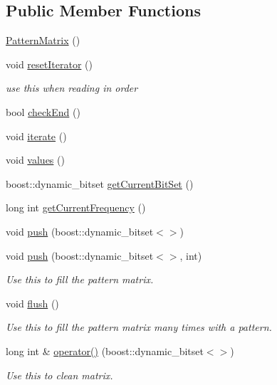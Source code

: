 \subsection*{Public Member Functions}
\begin{DoxyCompactItemize}
\item 
\hyperlink{classPatternMatrix_aaaf6e5d86e4d5fd0bbc907f5c445f1d7}{Pattern\+Matrix} ()
\item 
void \hyperlink{classPatternMatrix_a636096859a24b38dd40623e581bcb460}{reset\+Iterator} ()
\begin{DoxyCompactList}\small\item\em use this when reading in order \end{DoxyCompactList}\item 
bool \hyperlink{classPatternMatrix_ae005cb9835142294ed5cbad3c9ab6a0f}{check\+End} ()
\item 
void \hyperlink{classPatternMatrix_a6b6ba61b62f8bfdba73531d47c64564b}{iterate} ()
\item 
void \hyperlink{classPatternMatrix_a45439edd37b28bf95db6834109a6b73b}{values} ()
\item 
boost\+::dynamic\+\_\+bitset \hyperlink{classPatternMatrix_a0b425a01da86b03bb6391048249865a6}{get\+Current\+Bit\+Set} ()
\item 
long int \hyperlink{classPatternMatrix_ac5daa989c86d2120ea02fcf9453aadce}{get\+Current\+Frequency} ()
\item 
void \hyperlink{classPatternMatrix_a5d119f21c186839184ada1bd9ac45014}{push} (boost\+::dynamic\+\_\+bitset$<$$>$)
\item 
void \hyperlink{classPatternMatrix_a726e8b1896020d5ae830e5b95ce2bb5e}{push} (boost\+::dynamic\+\_\+bitset$<$$>$, int)
\begin{DoxyCompactList}\small\item\em Use this to fill the pattern matrix. \end{DoxyCompactList}\item 
void \hyperlink{classPatternMatrix_a6277b0638d14a5f6e102f4579ad1db67}{flush} ()
\begin{DoxyCompactList}\small\item\em Use this to fill the pattern matrix many times with a pattern. \end{DoxyCompactList}\item 
long int \& \hyperlink{classPatternMatrix_a31abaeb56d1657aa8e239de985a1116f}{operator()} (boost\+::dynamic\+\_\+bitset$<$$>$)
\begin{DoxyCompactList}\small\item\em Use this to clean matrix. \end{DoxyCompactList}\item 
$$
\end{DoxyCompactItemize}

